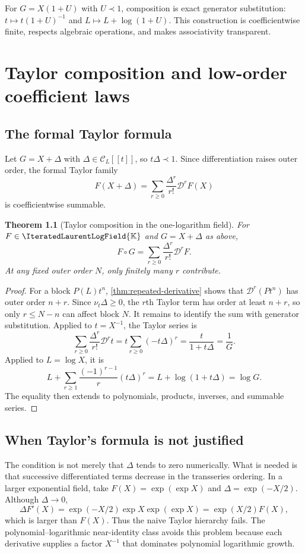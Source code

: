 \documentclass[11pt,oneside]{book}
\newtheorem{theorem}{Theorem}[chapter]
\theoremstyle{definition}
\theoremstyle{remark}
\newcommand{\K}{\mathbb K}
\newcommand{\PLfield}{\IteratedLaurentLogField{\K}}
\newcommand{\D}{\mathcal D}
\newcommand{\precdom}{\prec}
\newcommand{\compose}{\mathbin{\circ}}
\begin{document}
\begin{summarybox}
For $G=X(1+U)$ with $U\precdom1$, composition is exact generator
substitution:
$t\mapsto t(1+U)^{-1}$ and
$L\mapsto L+\log(1+U)$.  This construction is coefficientwise finite,
respects algebraic operations, and makes associativity transparent.
\end{summarybox}


\chapter{Taylor composition and low-order coefficient laws}
\label{ch:composition-taylor}

\section{The formal Taylor formula}
Let $G=X+\Delta$ with $\Delta\in\mathcal C_L[[t]]$, so
$t\Delta\precdom1$.  Since differentiation raises outer order, the formal
Taylor family
\begin{equation}\label{eq:taylor-composition}
 F(X+\Delta)
 =\sum_{r\ge0}\frac{\Delta^r}{r!}\D^rF(X)
\end{equation}
is coefficientwise summable.

\begin{theorem}[Taylor composition in the one-logarithm field]
\label{thm:taylor-composition}
For $F\in\PLfield$ and $G=X+\Delta$ as above,
\begin{equation}\label{eq:taylor-composition-theorem}
 F\compose G
 =\sum_{r\ge0}\frac{\Delta^r}{r!}\D^rF.
\end{equation}
At any fixed outer order $N$, only finitely many $r$ contribute.
\end{theorem}
\begin{proof}
For a block $P(L)t^n$, \cref{thm:repeated-derivative} shows that
$\D^r(Pt^n)$ has outer order $n+r$.  Since $\nu_t\Delta\ge0$, the $r$th
Taylor term has order at least $n+r$, so only $r\le N-n$ can affect block
$N$.  It remains to identify the sum with generator substitution.  Applied
to $t=X^{-1}$, the Taylor series is
\[
 \sum_{r\ge0}\frac{\Delta^r}{r!}\D^rt
 =t\sum_{r\ge0}(-t\Delta)^r
 =\frac{t}{1+t\Delta}=\frac1G.
\]
Applied to $L=\log X$, it is
\[
 L+\sum_{r\ge1}\frac{(-1)^{r-1}}r(t\Delta)^r
 =L+\log(1+t\Delta)=\log G.
\]
The equality then extends to polynomials, products, inverses, and summable
series.
\end{proof}

\section{When Taylor's formula is not justified}
The condition is not merely that $\Delta$ tends to zero numerically.  What is
needed is that successive differentiated terms decrease in the transseries
ordering.  In a larger exponential field, take $F(X)=\exp(\exp X)$ and
$\Delta=\exp(-X/2)$.  Although $\Delta\to0$,
\[
 \Delta F'(X)=\exp(-X/2)\exp X\exp(\exp X)
 =\exp(X/2)F(X),
\]
which is larger than $F(X)$.  Thus the naive Taylor hierarchy fails.  The
polynomial--logarithmic near-identity class avoids this problem because each
derivative supplies a factor $X^{-1}$ that dominates polynomial logarithmic
growth.
\end{document}
